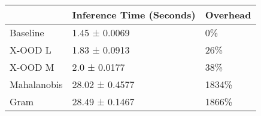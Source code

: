 \begin{tabular}{lll}
\toprule
{} & Inference Time (Seconds) & Overhead \\
\midrule
Baseline    &            1.45 ± 0.0069 &       0\% \\
X-OOD L     &            1.83 ± 0.0913 &      26\% \\
X-OOD M     &             2.0 ± 0.0177 &      38\% \\
Mahalanobis &           28.02 ± 0.4577 &    1834\% \\
Gram        &           28.49 ± 0.1467 &    1866\% \\
\bottomrule
\end{tabular}
